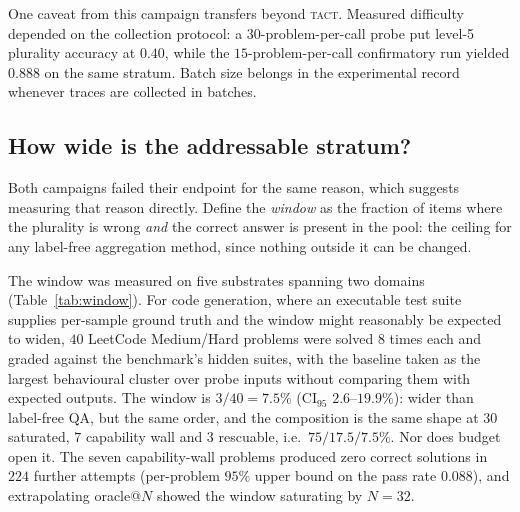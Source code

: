 \documentclass{article}
\newcommand{\TACT}{\textsc{tact}}
\begin{document}
One caveat from this campaign transfers beyond \TACT. Measured difficulty
depended on the collection protocol: a $30$-problem-per-call probe put
level-5 plurality accuracy at $0.40$, while the $15$-problem-per-call
confirmatory run yielded $0.888$ on the same stratum. Batch size belongs in
the experimental record whenever traces are collected in batches.

\subsection{How wide is the addressable stratum?}\label{sec:window}
Both campaigns failed their endpoint for the same reason, which suggests
measuring that reason directly. Define the \emph{window} as the fraction of
items where the plurality is wrong \emph{and} the correct answer is present
in the pool: the ceiling for any label-free aggregation method, since nothing
outside it can be changed.

The window was measured on five substrates spanning two domains
(Table~\ref{tab:window}). For code generation, where an executable test suite
supplies per-sample ground truth and the window might reasonably be expected
to widen, $40$ LeetCode Medium/Hard problems \citep{leetcodedataset} were
solved $8$ times each and graded against the benchmark's hidden suites, with
the baseline taken as the largest behavioural cluster over probe inputs
without comparing them with expected outputs. The window is $3/40=7.5\%$ (CI$_{95}$
$2.6$--$19.9\%$): wider than label-free QA, but the same order, and the
composition is the same shape at $30$ saturated, $7$ capability wall and $3$
rescuable, i.e.\ $75/17.5/7.5\%$. Nor does budget open it. The seven capability-wall problems
produced zero correct solutions in $224$ further attempts (per-problem $95\%$
upper bound on the pass rate $0.088$), and extrapolating oracle@$N$ showed the
window saturating by $N{=}32$.
\end{document}
